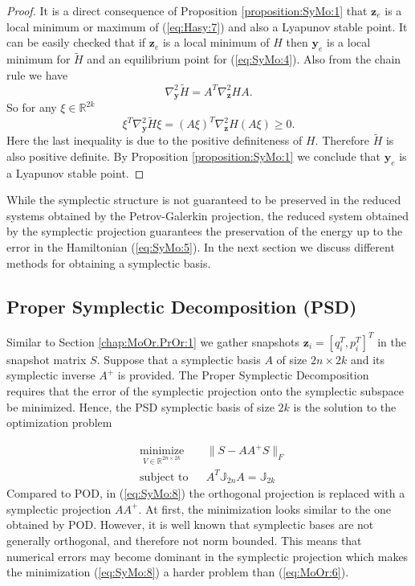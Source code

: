 {\begin{proof}
	It is a direct consequence of Proposition \ref{proposition:SyMo:1} that $\mathbf z_e$ is a local minimum or maximum of (\ref{eq:Hasy:7}) and also a Lyapunov stable point. It can be easily checked that if $\mathbf z_e$ is a local minimum of $H$ then $\mathbf y_e$ is a local minimum for $\tilde H$ and an equilibrium point for (\ref{eq:SyMo:4}). Also from the chain rule we have
\[
	\nabla^2_{\mathbf y} \tilde H = A^T \nabla^2_{\mathbf z} H A.
\]
So for any $\xi\in \mathbb R^{2k}$
\[
	\xi^T \nabla^2_{\mathbf y} \tilde H \xi = (A\xi)^T \nabla^2_{\mathbf z} H (A\xi) \geq 0.
\]
Here the last inequality is due to the positive definiteness of $H$. Therefore $\tilde H$ is also positive definite. By Proposition \ref{proposition:SyMo:1} we conclude that $\mathbf y_e$ is a Lyapunov stable point.
\end{proof}
}

While the symplectic structure is not guaranteed to be preserved in the reduced systems obtained by the Petrov-Galerkin projection, the reduced system obtained by the symplectic projection guarantees the preservation of the energy up to the error in the Hamiltonian (\ref{eq:SyMo:5}). In the next section we discuss  different methods for obtaining a symplectic basis.

\subsection{Proper Symplectic Decomposition (PSD)} \label{chap:SyMo.PrSy:1}

Similar to Section \ref{chap:MoOr.PrOr:1} we gather snapshots $\mathbf z_i = [q_i^T , p_i^T]^T$ in the snapshot matrix $S$. Suppose that a symplectic basis $A$ of size $2n\times2k$ and its symplectic inverse $A^+$ is provided. {\edit The Proper Symplectic Decomposition} requires that the error of the symplectic projection onto the symplectic subspace {\edit be minimized}. Hence, the PSD symplectic basis of size $2k$ is the solution to the optimization problem

\begin{equation} \label{eq:SyMo:8}
\begin{aligned}
& \underset{V\in \mathbb R^{2n\times 2k}}{\text{minimize}}
& & \| S - AA^+S\|_F \\
& \text{subject to}
& & A^T \mathbb{J}_{2n}A = \mathbb{J}_{2k}
\end{aligned}
\end{equation}
Compared to POD, in (\ref{eq:SyMo:8}) the orthogonal projection is replaced with a symplectic projection $AA^+$. At first, the minimization looks similar to the one obtained by POD. {\edit However, it is well known that symplectic bases are not generally orthogonal, and therefore not norm bounded. This means that numerical errors may become dominant in the symplectic projection \cite{Karow:2006cf} which makes the minimization (\ref{eq:SyMo:8}) a harder problem than (\ref{eq:MoOr:6}).}
	

